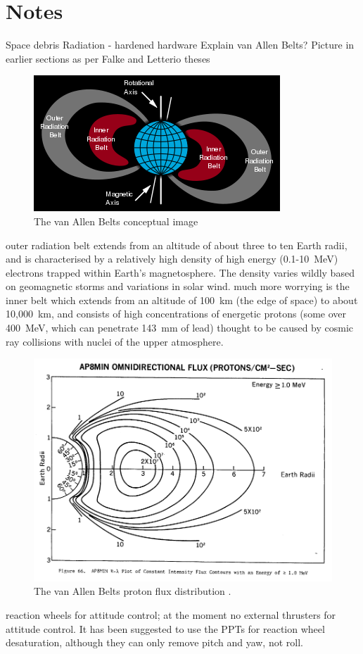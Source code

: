 \part{Notes}

Space debris
Radiation - hardened hardware
Explain van Allen Belts? Picture in earlier sections as per Falke and Letterio theses
\begin{figure}
\includegraphics[width=\textwidth]{Images/350px-Van_Allen_radiation_belt_svg.png}
\caption{The van Allen Belts conceptual image}\label{fig:vabs}
\end{figure}
outer radiation belt extends from an altitude of about three to ten Earth radii, and is characterised by a relatively high density of high energy (0.1-10~MeV) electrons trapped within Earth's magnetosphere. The density varies wildly based on geomagnetic storms and variations in solar wind.
much more worrying is the inner belt which extends from an altitude of 100~km (the edge of space) to about 10,000~km, and consists of high concentrations of energetic protons (some over 400~MeV, which can penetrate 143~mm of lead) thought to be caused by cosmic ray collisions with nuclei of the upper atmosphere.
\begin{figure}
\includegraphics[width=\textwidth]{Images/Ap8-omni-1_000MeV.png}
\caption{The van Allen Belts proton flux distribution \parencite{Sawyer1976}.}\label{fig:vabs}
\end{figure}
reaction wheels for attitude control; at the moment no external thrusters for attitude control. It has been suggested to use the PPTs for reaction wheel desaturation, although they can only remove pitch and yaw, not roll.

